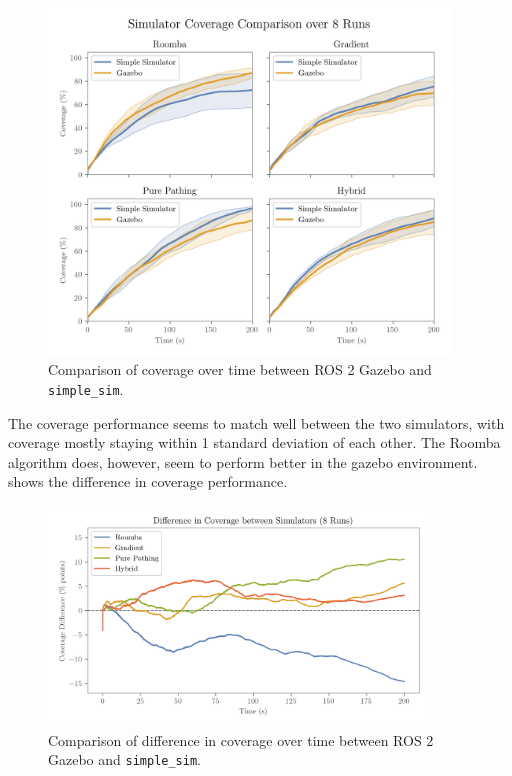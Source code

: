 \begin{figure}[H]
    \centering
    \includegraphics[width=0.95\textwidth]{./figures/plots/consistency/gazebo_vs_simple_sim_coverage.png}
    \caption{Comparison of coverage over time between ROS 2 Gazebo and \texttt{simple\_sim}.}
    \label{fig:coverage-benchmark-all}
\end{figure}

The coverage performance seems to match well between the two simulators, with coverage mostly staying within 1 standard deviation of each other. The Roomba algorithm does, however, seem to perform better in the gazebo environment.  shows the difference in coverage performance.

\begin{figure}[H]
    \begin{center}
        \includegraphics[width=0.90\textwidth]{./figures/plots/consistency/sim_coverage_diff.png}
    \end{center}
    \caption{Comparison of difference in coverage over time between ROS 2 Gazebo and \texttt{simple\_sim}.}
    \label{fig:coverage-benchmark-diff}
\end{figure}

